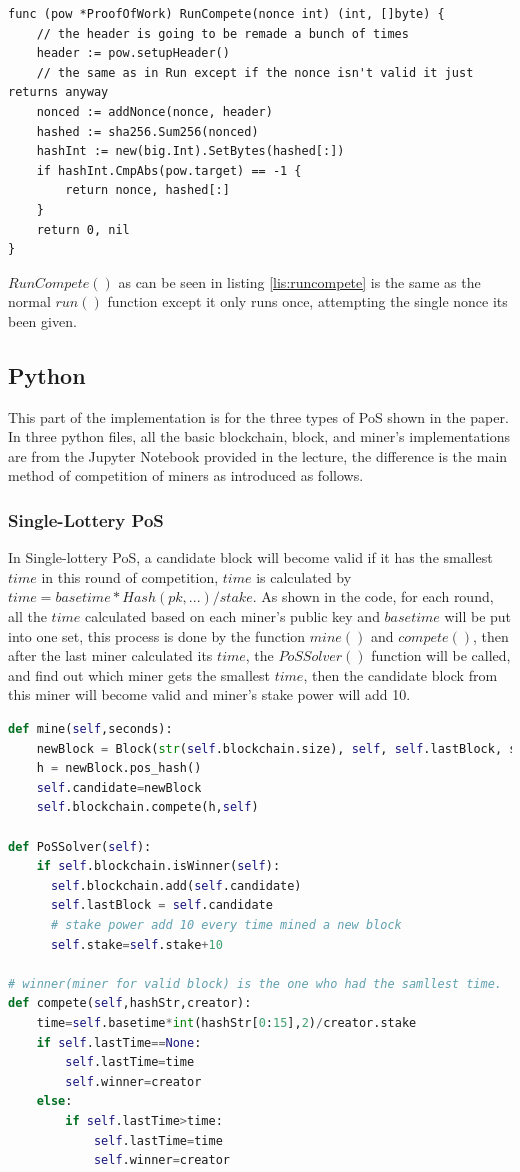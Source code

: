 \documentclass{article}
\begin{document}
\begin{lstlisting}[language=Golang, caption=RunCompete, label={lis:runcompete}]
func (pow *ProofOfWork) RunCompete(nonce int) (int, []byte) {
	// the header is going to be remade a bunch of times
	header := pow.setupHeader()
	// the same as in Run except if the nonce isn't valid it just returns anyway
	nonced := addNonce(nonce, header)
	hashed := sha256.Sum256(nonced)
	hashInt := new(big.Int).SetBytes(hashed[:])
	if hashInt.CmpAbs(pow.target) == -1 {
		return nonce, hashed[:]
	}
	return 0, nil
}
\end{lstlisting}

$RunCompete()$ as can be seen in listing \ref{lis:runcompete} is the same as the normal $run()$ function except it only runs once, attempting the single nonce its been given.


\subsection{Python}
This part of the implementation is for the three types of \gls{PoS} shown in the paper. In three python files, all the basic blockchain, block, and miner's implementations are from the Jupyter Notebook provided in the lecture, the difference is the main method of competition of miners as introduced as follows.
\subsubsection{Single-Lottery \gls{PoS}}
In Single-lottery \gls{PoS}, a candidate block will become valid if it has the smallest $time$ in this round of competition, $time$ is calculated by $time=basetime*Hash(pk, . . . )/stake$. As shown in the code, for each round, all the $time$ calculated based on each miner's public key and $basetime$ will be put into one set, this process is done by the function $mine()$ and $compete()$, then after the last miner calculated its $time$, the $PoSSolver()$ function will be called, and find out which miner gets the smallest $time$, then the candidate block from this miner will become valid and miner's stake power will add 10.

\lstset{style=mystyle}
\begin{lstlisting}[language=Python, caption=Single-Lottery \gls{PoS}]
def mine(self,seconds):
    newBlock = Block(str(self.blockchain.size), self, self.lastBlock, seconds)
    h = newBlock.pos_hash()
    self.candidate=newBlock
    self.blockchain.compete(h,self)

def PoSSolver(self):
    if self.blockchain.isWinner(self):
      self.blockchain.add(self.candidate)
      self.lastBlock = self.candidate
      # stake power add 10 every time mined a new block
      self.stake=self.stake+10

# winner(miner for valid block) is the one who had the samllest time.
def compete(self,hashStr,creator):
    time=self.basetime*int(hashStr[0:15],2)/creator.stake
    if self.lastTime==None:
        self.lastTime=time
        self.winner=creator
    else:
        if self.lastTime>time:
            self.lastTime=time
            self.winner=creator
\end{lstlisting}
\end{document}
